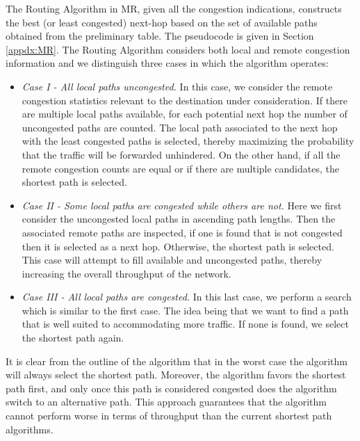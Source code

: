 The Routing Algorithm in MR, given all the congestion indications, constructs the best (or least congested) next-hop based on the set of available paths obtained from the preliminary table. The pseudocode is given in Section \ref{appdx:MR}. The Routing Algorithm considers both local and remote congestion information and we distinguish three cases in which the algorithm operates:

\begin{itemize}
 \item \textit{Case I - All local paths uncongested.} In this case, we consider the remote congestion statistics relevant to the destination under consideration. If there are multiple local paths available, for each potential next hop the number of uncongested paths are counted. The local path associated to the next hop with the least congested paths is selected, thereby maximizing the probability that the traffic will be forwarded unhindered. On the other hand, if all the remote congestion counts are equal or if there are multiple candidates, the shortest path is selected.
 \item \textit{Case II - Some local paths are congested while others are not.} Here we first consider the uncongested local paths in ascending path lengths. Then the associated remote paths are inspected, if one is found that is not congested then it is selected as a next hop. Otherwise, the shortest path is selected. This case will attempt to fill available and uncongested paths, thereby increasing the overall throughput of the network.
 \item \textit{Case III - All local paths are congested.} In this last case, we perform a search which is similar to the first case. The idea being that we want to find a path that is well suited to accommodating more traffic. If none is found, we select the shortest path again.
\end{itemize}

It is clear from the outline of the algorithm that in the worst case the algorithm will always select the shortest path. Moreover, the algorithm favors the shortest path first, and only once this path is considered congested does the algorithm switch to an alternative path. This approach guarantees that the algorithm cannot perform worse in terms of throughput than the current shortest path algorithms.

